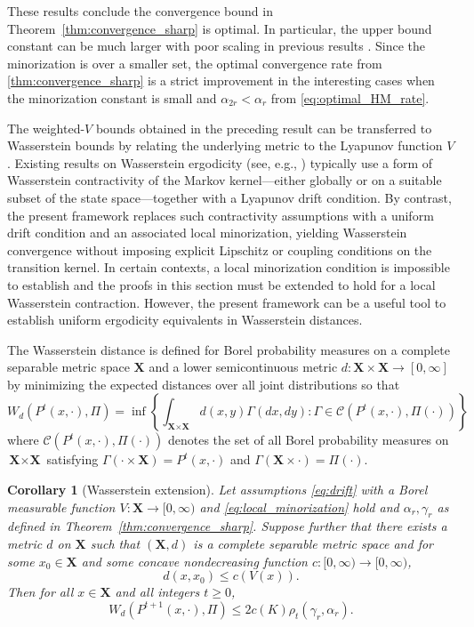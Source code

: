 \documentclass[ejsv2, noshowframe]{imsart}
\theoremstyle{plain}
\newtheorem{corollary}[theorem]{Corollary}
\theoremstyle{definition}
\theoremstyle{remark}
\renewcommand{\P}{P}
\newcommand{\X}{\textbf{X}}
\newcommand{\C}{\mathcal{C}}
\begin{document}
These results conclude the convergence bound in Theorem~\ref{thm:convergence_sharp} is optimal.
In particular, the upper bound constant can be much larger with poor scaling in previous results \citep{hairer:mattingly:2011}.
Since the minorization is over a smaller set, the optimal convergence rate from \ref{thm:convergence_sharp} is a strict improvement in the interesting cases when the minorization constant is small and $\alpha_{2r} < \alpha_{r}$ from \eqref{eq:optimal_HM_rate}.

The weighted-$V$ bounds obtained in the preceding result can be transferred to Wasserstein bounds by relating the underlying metric to the Lyapunov function $V$. Existing results on Wasserstein ergodicity (see, e.g., \cite{hairer:mattingly:2011, HairerMattinglyScheutzow2011, Eberle2016}) typically use a form of Wasserstein contractivity of the Markov kernel—either globally or on a suitable subset of the state space—together with a Lyapunov drift condition. 
By contrast, the present framework replaces such contractivity assumptions with a uniform drift condition and an associated local minorization, yielding Wasserstein convergence without imposing explicit Lipschitz or coupling conditions on the transition kernel.
In certain contexts, a local minorization condition is impossible to establish and the proofs in this section must be extended to hold for a local Wasserstein contraction.
However, the present framework can be a useful tool to establish uniform ergodicity equivalents in Wasserstein distances.

The Wasserstein distance is defined for Borel probability measures on a complete separable metric space $\X$ and a lower semicontinuous metric $d : \X \times \X \to [0, \infty]$ by minimizing the expected distances over all joint distributions so that
\[
W_d\left( \P^t(x, \cdot) , \Pi \right)
= \inf\left\{ \int_{\X \times \X} d(x, y) \Gamma(dx, dy) : \Gamma \in \C(\P^t(x, \cdot), \Pi(\cdot) ) \right\}
\]
where $\C(\P^t(x, \cdot), \Pi(\cdot) )$ denotes the set of all Borel probability measures on $\X \times \X$ satisfying $\Gamma(\cdot \times \X) = \P^t(x, \cdot)$ and $\Gamma(\X \times \cdot) = \Pi(\cdot)$.


\begin{corollary}[Wasserstein extension] \label{cor:wasserstein}
Let assumptions \eqref{eq:drift} with a Borel measurable function $V : \X \to [0, \infty)$ and \eqref{eq:local_minorization} hold and $\alpha_r, \gamma_r$ as defined in Theorem~\ref{thm:convergence_sharp}.
Suppose further that there exists a metric $d$ on $\X$ such that $(\X, d)$ is a complete separable metric space and for some $x_0 \in \X$ and some concave nondecreasing function $c : [0, \infty) \to [0, \infty)$,
\[
d(x,x_0) \le c(V(x)).
\]
Then for all $x \in \X$ and all integers $t \ge 0$,
\[
W_d (P^{t + 1}(x,\cdot), \Pi)
\le 2 c(K) \rho_{t}(\gamma_r, \alpha_r).
\]
\end{corollary}
\end{document}
